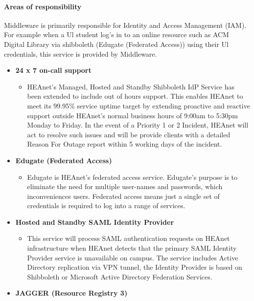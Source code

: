 \documentclass{article}
\begin{document}
\paragraph{Areas of responsibility \newline}
Middleware is primarily responsible for Identity and Access Management (IAM). For example when a Ul student log's in to an online resource such as ACM Digital Library via shibboleth (Edugate (Federated Access)) using their Ul credentials, this service is provided by Middleware.
\begin{itemize}
	\item \textbf{24 x 7  on-call support}
	      \begin{itemize}
	      	\item HEAnet's Managed, Hosted and Standby Shibboleth IdP Service has been extended to include out of hours support. This enables HEAnet to meet its 99.95\% service uptime target by extending proactive and reactive support outside HEAnet's normal business hours of 9:00am to 5:30pm Monday to Friday. In the event of a Priority 1 or 2 Incident, HEAnet will act to resolve such issues and will be provide clients with a detailed Reason For Outage report within 5 working days of the incident. 	
	      \end{itemize}
	\item \textbf{Edugate (Federated Access)}
	      \begin{itemize}
	      	\item Edugate is HEAnet's federated access service. Edugate's purpose is to eliminate the need for multiple user-names and passwords, which inconveniences users. Federated access means just a single set of credentials is required to log into a range of services.	
	      \end{itemize}
	\item \textbf{Hosted and Standby SAML Identity Provider}
	      \begin{itemize}
	      	\item This service will process SAML authentication requests on HEAnet infrastructure when HEAnet detects that the primary SAML Identity Provider service is unavailable on campus. The service includes Active Directory replication via VPN tunnel, the Identity Provider is based on Shibboleth or Microsoft Active Directory Federation Services.	
	      \end{itemize}
	\item \textbf{JAGGER (Resource Registry 3)}
	      \begin{itemize}

\end{itemize}
\end{itemize}
\end{document}
